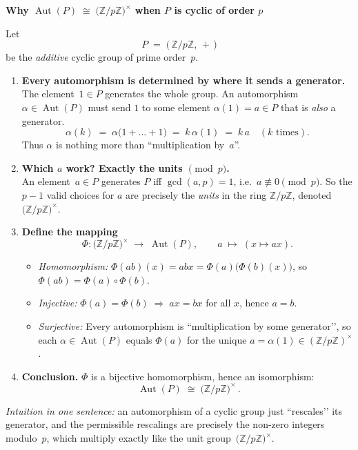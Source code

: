 \documentclass[12pt]{article}
\DeclareMathOperator{\Aut}{Aut}
\theoremstyle{definition} %
\theoremstyle{plain} %
\begin{document}
\newcommand{\Z}{\mathbb{Z}}
\begin{center}
\textbf{Why $\Aut(P)\;\cong\;\bigl(\Z/p\Z\bigr)^{\times}$ when $P$ is cyclic of order $p$}
\end{center}

\medskip
Let 
\[
   P \;=\; \bigl(\, \Z/p\Z,\,+\,\bigr)
\]
be the \emph{additive} cyclic group of prime order~$p$.

\begin{enumerate}
   \item \textbf{Every automorphism is determined by where it sends a generator.}\\
         The element~$1\in P$ generates the whole group.  
         An automorphism $\alpha\in\Aut(P)$ must send $1$ to some element 
         $\alpha(1)=a\in P$ that is \emph{also} a generator.
         \[
            \alpha(k)\;=\;\alpha\!\bigl(1+\dots+1\bigr)
            \;=\;k\,\alpha(1)
            \;=\;k\,a\quad(\text{$k$ times}).
         \]
         Thus $\alpha$ is nothing more than ``multiplication by~$a$''.

   \item \textbf{Which $a$ work?  Exactly the units $\pmod{p}$.}\\
         An element~$a\in P$ generates $P$ iff $\gcd(a,p)=1$,
         i.e.\ $a\not\equiv 0\pmod{p}$.  
         So the $p-1$ valid choices for $a$ are precisely the
         \emph{units} in the ring $\Z/p\Z$, denoted
         $\bigl(\Z/p\Z\bigr)^{\times}$.

   \item \textbf{Define the mapping}
         \[
            \Phi : \bigl(\Z/p\Z\bigr)^{\times}\;\longrightarrow\;\Aut(P),
            \qquad
            a \;\longmapsto\;(x\mapsto ax).
         \]
         \begin{itemize}
            \item \emph{Homomorphism:}
                  $\Phi(ab)(x)=abx=\Phi(a)\!\bigl(\Phi(b)(x)\bigr)$,  
                  so $\Phi(ab)=\Phi(a)\circ\Phi(b)$.
            \item \emph{Injective:}
                  $\Phi(a)=\Phi(b)\;\Rightarrow\;ax=bx$ for all $x$,
                  hence $a=b$.
            \item \emph{Surjective:}
                  Every automorphism is ``multiplication by some generator’’,
                  so each $\alpha\in\Aut(P)$ equals $\Phi(a)$
                  for the unique $a=\alpha(1)\in(\Z/p\Z)^{\times}$.
         \end{itemize}

   \item \textbf{Conclusion.}\;
         $\Phi$ is a bijective homomorphism, hence an isomorphism:
         \[
            \boxed{\;\Aut(P)\;\cong\;\bigl(\Z/p\Z\bigr)^{\times}\,. }
         \]
\end{enumerate}

\medskip
\textit{Intuition in one sentence:}  
an automorphism of a cyclic group just “rescales’’ its generator,
and the permissible rescalings are precisely the non-zero
integers modulo~$p$, which multiply exactly like
the unit group~$\bigl(\Z/p\Z\bigr)^{\times}$.
\end{document}
